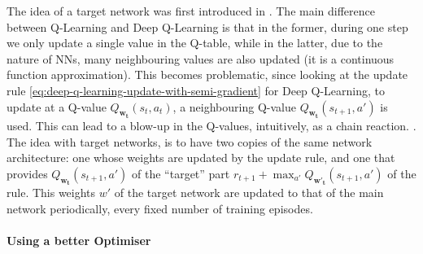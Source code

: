The idea of a target network was first introduced in \cite{argueta1992targetnetwork}. The main difference between Q-Learning and Deep Q-Learning is that in the former, during one step we only update a single value in the Q-table, while in the latter, due to the nature of NNs, many neighbouring values are also updated (it is a continuous function approximation). This becomes problematic, since looking at the update rule \ref{eq:deep-q-learning-update-with-semi-gradient} for Deep Q-Learning, to update at a Q-value $Q_{\mathbf{w_t}}(s_t, a_t)$, a neighbouring Q-value $Q_{\mathbf{w_t}}(s_{t+1}, a')$ is used. This can lead to a blow-up in the Q-values, intuitively, as a chain reaction. . The idea with target networks, is to have two copies of the same network architecture: one whose weights are updated by the update rule, and one that provides $Q_{\mathbf{w_t}}(s_{t+1}, a')$ of the ``target'' part $r_{t+1}+ \max_{a'} Q_{\mathbf{w'_t}}(s_{t+1}, a')$ of the rule. This weights $w'$ of the target network are updated to that of the main network periodically, every fixed number of training episodes.


\paragraph{Using a better Optimiser}


